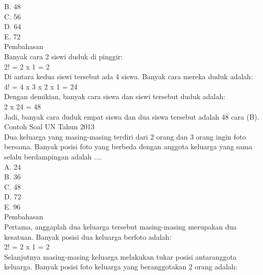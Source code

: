 \documentclass[11pt,fleqn]{book} %
\begin{document}
B.   48\\

C.   56\\

D.   64\\

E.   72\\

Pembahasan\\
Banyak cara 2 siswi duduk di pinggir:\\

2! = 2 x 1 = 2\\

Di antara kedua siswi tersebut ada 4 siswa. Banyak cara mereka duduk adalah:\\

4! = 4 x 3 x 2 x 1 = 24\\

Dengan demikian, banyak cara siswa dan siswi tersebut duduk adalah:\\

2 x 24 = 48\\

Jadi, banyak cara duduk empat siswa dan dua siswa tersebut adalah 48 cara (B).\\

Contoh Soal UN Tahun 2013\\
Dua keluarga yang masing-masing terdiri dari 2 orang dan 3 orang ingin foto bersama. Banyak posisi foto yang berbeda dengan anggota keluarga yang sama selalu berdampingan adalah ....\\

A.   24\\

B.   36\\

C.   48\\

D.   72\\

E.   96\\


Pembahasan\\
Pertama, anggaplah dua keluarga tersebut masing-masing merupakan dua kesatuan. Banyak posisi dua keluarga berfoto adalah:\\

2! = 2 x 1 = 2\\

Selanjutnya masing-masing keluarga melakukan tukar posisi antaranggota keluarga. Banyak posisi foto keluarga yang beranggotakan 2 orang adalah:\\
\end{document}
